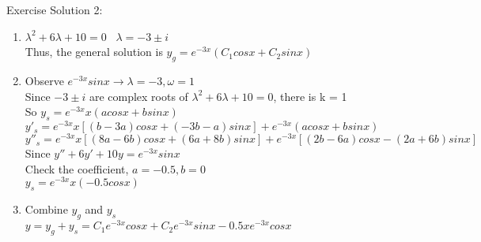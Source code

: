 \begin{frame}{Exercise}
    Solution 2:
    \begin{enumerate}
        \item $\lambda^2 + 6\lambda + 10 = 0$ \ $\lambda = -3 \pm i$ \\Thus, the general solution is $y_g = e^{-3x}(C_1cosx + C_2 sinx)$
        \item Observe $e^{-3x}sinx \rightarrow \lambda = -3, \omega = 1$ \\ Since $-3\pm i$ are complex roots of $\lambda^2 + 6 \lambda + 10 = 0$, there is k = 1 \\So $y_s = e^{-3x}x(acosx + bsinx)$\\ $y'_s = e^{-3x}x[(b-3a)cosx + (-3b-a)sinx] +e^{-3x}(acosx + bsinx)$\\
              $y''_s = e^{-3x}x[(8a - 6b)cosx + (6a + 8b)sinx] + e^{-3x}[(2b-6a)cosx - (2a + 6b)sinx]$\\
              Since $y''+6y'+ 10y = e^{-3x}sinx$\\ Check the coefficient, $a = -0.5, b = 0$\\ $y_s = e^{-3x}x (-0.5cosx)$
        \item Combine $y_g$ and $y_s$\\
              $y = y_g + y_s = C_1 e^{-3x}cosx + C_2 e^{-3x}sinx - 0.5 xe^{-3x}cosx$

    \end{enumerate}
\end{frame}